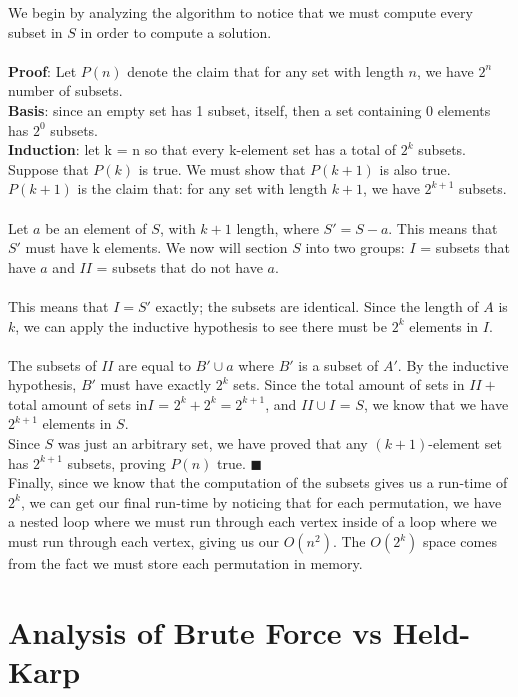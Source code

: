 \documentclass[a4paper,titlepage, margin, 11pt]{article}
\numberwithin{equation}{section}
\begin{document}
We begin by analyzing the algorithm to notice that we must compute every subset in $S$ in order to compute a solution. \\\\
\textbf{Proof}: Let $P(n)$ denote the claim that for any set with length $n$, we have $2^n$ number of subsets.\\
\textbf{Basis}: since an empty set has 1 subset, itself, then a set containing 0 elements has $2^0$ subsets. \\
\textbf{Induction}: let k = n so that every k-element set has a total of $2^k$ subsets. Suppose that $P(k)$ is true. We must show that $P(k+1)$ is also true. 
$P(k+1)$ is the claim that: for any set with length $k+1$, we have $2^{k+1}$ subsets.\\\\
Let $a$ be an element of $S$, with $k+1$ length, where $S' = S-a$. This means that $S'$ must have k elements. We now will section $S$ into two groups: $I$ = subsets that have $a$ and $II$ = subsets that do not have $a$.\\\\
This means that $I = S'$ exactly; the subsets are identical. Since the length of $A$ is $k$, we can apply the inductive hypothesis to see there must be $2^k$ elements in $I$.\\\\
The subsets of $II$ are equal to $B'\cup a$ where $B'$ is a subset of $A'$. By the inductive hypothesis, $B'$ must have exactly $2^k$ sets.
Since the total amount of sets in $ II +$ total amount of sets in$ I$ = $2^k+2^k = 2^{k+1}$, and $II \cup I$ = $S$, we know that we have $2^{k+1}$ elements in $S$.\\
Since $S$ was just an arbitrary set, we have proved that any $(k+1)$-element set has $2^{k+1}$ subsets, proving $P(n)$ true.
$\blacksquare$\\

Finally, since we know that the computation of the subsets gives us a run-time of $2^k$, we can get our final run-time by noticing that for each permutation, we have a nested loop where we must run through each vertex inside of a loop where we must run through each vertex, giving us our $O(n^2)$. The $O(2^k)$ space comes from the fact we must store each permutation in memory.

\newpage

\section{Analysis of Brute Force vs Held-Karp}
\end{document}
